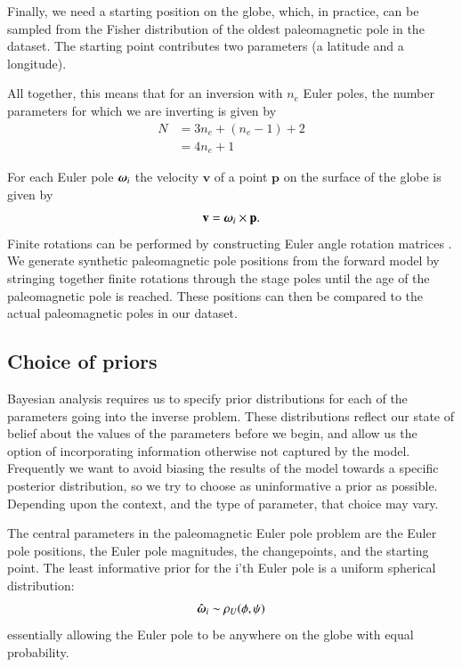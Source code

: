 \documentclass[preprint,12pt,authoryear]{elsarticle}
\newcommand{\mitbf}[1]{\hbox{\mathversion{bold}$#1$}}
\begin{document}
Finally, we need a starting position on the globe, which, in practice, can be sampled
from the Fisher distribution of the oldest paleomagnetic pole in the dataset.
The starting point contributes two parameters (a latitude and a longitude).

All together, this means that for an inversion with $n_e$ Euler poles, 
the number parameters for which we are inverting is given by
\begin{equation}
\begin{aligned}
N &= 3 n_e + (n_e -1) + 2 \\
 &= 4 n_e + 1
\end{aligned}
\label{eq:n_parameters}
\end{equation}

For each Euler pole $\mitbf{\omega}_i$ the velocity $\mathbf{v}$ of a point 
$\mathbf{p}$ on the surface of the globe is given by
\begin{equation}
\mathbf{v} = \mitbf{\omega}_i \times \mathbf{p}.
\label{eq:rigid_rotation}
\end{equation}
Finite rotations can be performed by constructing Euler angle rotation matrices \citep[cf.][]{goldstein1965classical}. 
We generate synthetic paleomagnetic pole positions from the forward model by stringing together
finite rotations through the stage poles until the age of the paleomagnetic pole
is reached. These positions can then be compared to the actual paleomagnetic poles in our dataset.

\subsection{Choice of priors}

Bayesian analysis requires us to specify prior distributions for each of the parameters going into the inverse problem.
These distributions reflect our state of belief about the values of the parameters before we begin,
and allow us the option of incorporating information otherwise not captured by the model.
Frequently we want to avoid biasing the results of the model towards a specific posterior distribution,
so we try to choose as uninformative a prior as possible. Depending upon the context, and the type
of parameter, that choice may vary.

The central parameters in the paleomagnetic Euler pole problem are the Euler pole positions,
the Euler pole magnitudes, the changepoints, and the starting point. 
The least informative prior for the i'th Euler pole is a uniform spherical distribution:
\begin{equation}
\hat{\mitbf{\omega}}_i \sim \rho_U(\phi, \psi)
\end{equation}
essentially allowing the Euler pole to be anywhere on the globe with equal probability.
\end{document}
